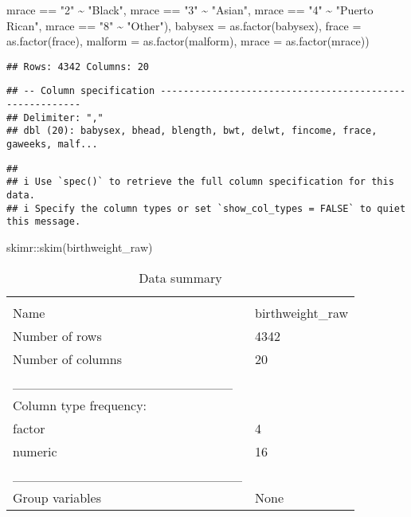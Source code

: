 \documentclass[
]{article}
\newenvironment{Shaded}{\begin{snugshade}}{\end{snugshade}}
\newcommand{\AttributeTok}[1]{\textcolor[rgb]{0.77,0.63,0.00}{#1}}
\newcommand{\FunctionTok}[1]{\textcolor[rgb]{0.00,0.00,0.00}{#1}}
\newcommand{\NormalTok}[1]{#1}
\newcommand{\SpecialCharTok}[1]{\textcolor[rgb]{0.00,0.00,0.00}{#1}}
\newcommand{\StringTok}[1]{\textcolor[rgb]{0.31,0.60,0.02}{#1}}
\begin{document}
\begin{Shaded}
\begin{Highlighting}[]
\NormalTok{                      mrace }\SpecialCharTok{==} \StringTok{"2"} \SpecialCharTok{\textasciitilde{}} \StringTok{"Black"}\NormalTok{,}
\NormalTok{                      mrace }\SpecialCharTok{==} \StringTok{"3"} \SpecialCharTok{\textasciitilde{}} \StringTok{"Asian"}\NormalTok{,}
\NormalTok{                      mrace }\SpecialCharTok{==} \StringTok{"4"} \SpecialCharTok{\textasciitilde{}} \StringTok{"Puerto Rican"}\NormalTok{,}
\NormalTok{                      mrace }\SpecialCharTok{==} \StringTok{"8"} \SpecialCharTok{\textasciitilde{}} \StringTok{"Other"}\NormalTok{),}
    \AttributeTok{babysex =} \FunctionTok{as.factor}\NormalTok{(babysex),}
    \AttributeTok{frace =} \FunctionTok{as.factor}\NormalTok{(frace),}
    \AttributeTok{malform =} \FunctionTok{as.factor}\NormalTok{(malform),}
    \AttributeTok{mrace =} \FunctionTok{as.factor}\NormalTok{(mrace))}
\end{Highlighting}
\end{Shaded}

\begin{verbatim}
## Rows: 4342 Columns: 20
\end{verbatim}

\begin{verbatim}
## -- Column specification --------------------------------------------------------
## Delimiter: ","
## dbl (20): babysex, bhead, blength, bwt, delwt, fincome, frace, gaweeks, malf...
\end{verbatim}

\begin{verbatim}
## 
## i Use `spec()` to retrieve the full column specification for this data.
## i Specify the column types or set `show_col_types = FALSE` to quiet this message.
\end{verbatim}

\begin{Shaded}
\begin{Highlighting}[]
\NormalTok{skimr}\SpecialCharTok{::}\FunctionTok{skim}\NormalTok{(birthweight\_raw)}
\end{Highlighting}
\end{Shaded}

\begin{longtable}[]{@{}ll@{}}
\caption{Data summary}\tabularnewline
\toprule
& \\
\midrule
\endfirsthead
\toprule
& \\
\midrule
\endhead
Name & birthweight\_raw \\
Number of rows & 4342 \\
Number of columns & 20 \\
\_\_\_\_\_\_\_\_\_\_\_\_\_\_\_\_\_\_\_\_\_\_\_ & \\
Column type frequency: & \\
factor & 4 \\
numeric & 16 \\
\_\_\_\_\_\_\_\_\_\_\_\_\_\_\_\_\_\_\_\_\_\_\_\_ & \\
Group variables & None \\
\bottomrule
\end{longtable}
\end{document}
